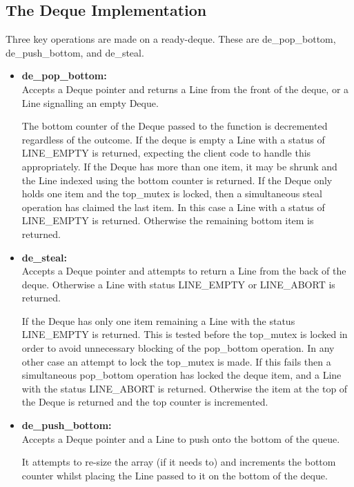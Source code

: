 \subsection{The Deque Implementation}
\label{sec:dequeimp}

Three key operations are made on a ready-deque. These are de\_pop\_bottom, de\_push\_bottom, and de\_steal.

\begin{itemize}
\item \textbf{de\_pop\_bottom: } \\
                         Accepts a Deque pointer and returns a Line from the front of the deque, or a Line signalling an empty Deque.
                         
                         The bottom counter of the Deque passed to the function is decremented regardless of the outcome.
                         If the deque is empty a Line with a status of LINE\_EMPTY is returned, 
                         expecting the client code to handle this appropriately. 
                         If the Deque has more than one item, it may be shrunk and the Line indexed using the bottom counter is returned.
                         If the Deque only holds one item and the top\_mutex is locked, then a simultaneous steal operation has claimed
                         the last item. In this case a Line with a status of LINE\_EMPTY is returned. 
                         Otherwise the remaining bottom item is returned.

\item \textbf{de\_steal: } \\
                         Accepts a Deque pointer and attempts to return a Line from the back of the deque. Otherwise a Line with 
                         status LINE\_EMPTY or LINE\_ABORT is returned. 
                         
                         If the Deque has only one item remaining a Line with the status LINE\_EMPTY is returned. 
                         This is tested before the top\_mutex is locked in order to avoid unnecessary blocking of the pop\_bottom operation.
                         In any other case an attempt to lock the top\_mutex is made. If this fails then a simultaneous pop\_bottom operation
                         has locked the deque item, and a Line with the status LINE\_ABORT is returned. 
                         Otherwise the item at the top of the Deque is returned and the top counter is incremented.

\item \textbf{de\_push\_bottom: } \\
                         Accepts a Deque pointer and a Line to push onto the bottom of the queue. 
                         
                         It attempts to re-size the array (if it needs to) and increments the bottom counter whilst placing the 
                         Line passed to it on the bottom of the deque.
\end{itemize}

